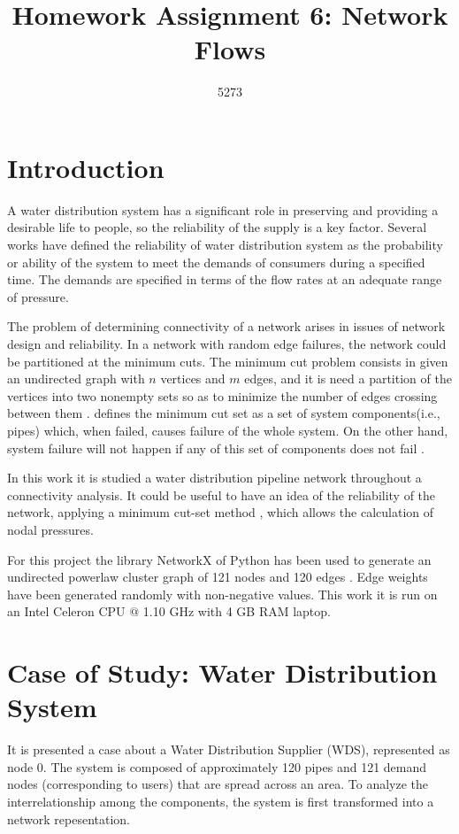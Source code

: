 \documentclass[10pt,a4paper,openany]{article}
\author{5273}
\title{Homework Assignment 6: Network Flows}
\date{}
\begin{document}
	
\maketitle

	\section*{Introduction}
	
	A water distribution system has a significant role in preserving and providing a desirable life to people, so the reliability of the supply is a key factor. Several works have defined the reliability of water distribution system \citep{kaufmann1977mathematical,goulter1995analytical,cullinane1992optimization} as the probability or ability of the system to meet the demands of consumers during a specified time. The demands are specified in terms of the flow rates at an adequate range of pressure.
	
	The problem of determining connectivity of a network arises in issues of network design and reliability. In a network with random edge failures, the network could be partitioned at the minimum cuts. The minimum cut problem consists in given an undirected graph with $ n $ vertices and $ m $ edges, and it is need a partition of the vertices into two nonempty sets so as to minimize the number of edges crossing between them \citep{karger1996new}. \citet{su1987reliability} defines the minimum cut set as a set of system components(i.e., pipes) which, when failed, causes failure of the whole system. On the other hand, system failure will not happen if any of this set of components does not fail \citep{billinton1992reliability}.
	 
	In this work it is studied a water distribution pipeline network throughout a connectivity analysis. It could be useful to have an idea of the reliability of the network, applying a minimum cut-set method \citep{al2005evaluation}, which allows the calculation of nodal pressures.
	
	For this project the library NetworkX of Python has been used to generate an undirected powerlaw cluster graph of 121 nodes and 120 edges \citep{networkx}. Edge weights have been generated randomly with non-negative values. This work it is run on an Intel Celeron CPU $ @ $ 1.10 GHz with 4 GB RAM laptop.
	
	\section*{Case of Study: Water Distribution System}
	It is presented a case about a Water Distribution Supplier (WDS), represented as node 0. The  system is composed of approximately 120 pipes and 121 demand  nodes (corresponding to users) that are spread across an area. To analyze the interrelationship among the components, the system is first transformed into a network repesentation.
	
\end{document}
